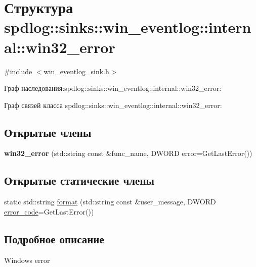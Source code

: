 \hypertarget{structspdlog_1_1sinks_1_1win__eventlog_1_1internal_1_1win32__error}{}\section{Структура spdlog\+:\+:sinks\+:\+:win\+\_\+eventlog\+:\+:internal\+:\+:win32\+\_\+error}
\label{structspdlog_1_1sinks_1_1win__eventlog_1_1internal_1_1win32__error}


{\ttfamily \#include $<$win\+\_\+eventlog\+\_\+sink.\+h$>$}



Граф наследования\+:spdlog\+:\+:sinks\+:\+:win\+\_\+eventlog\+:\+:internal\+:\+:win32\+\_\+error\+:


Граф связей класса spdlog\+:\+:sinks\+:\+:win\+\_\+eventlog\+:\+:internal\+:\+:win32\+\_\+error\+:
\subsection*{Открытые члены}
\begin{DoxyCompactItemize}
\item 
\mbox{\label{structspdlog_1_1sinks_1_1win__eventlog_1_1internal_1_1win32__error_add0cd8c40fc443d60c36a983edf5cdd5}} 
{\bfseries win32\+\_\+error} (std\+::string const \&func\+\_\+name, D\+W\+O\+RD error=Get\+Last\+Error())
\end{DoxyCompactItemize}
\subsection*{Открытые статические члены}
\begin{DoxyCompactItemize}
\item 
static std\+::string \hyperlink{structspdlog_1_1sinks_1_1win__eventlog_1_1internal_1_1win32__error_ac257bfbcd3a8e7d1be75074b7d41ab6d}{format} (std\+::string const \&user\+\_\+message, D\+W\+O\+RD \hyperlink{classerror__code}{error\+\_\+code}=Get\+Last\+Error())
\end{DoxyCompactItemize}


\subsection{Подробное описание}
Windows error 

